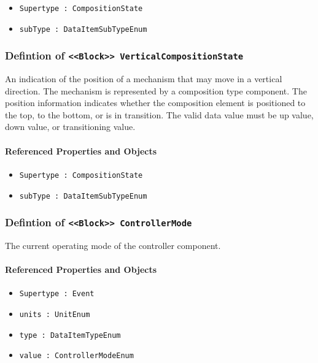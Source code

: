 \begin{itemize}
\item \texttt{Supertype : CompositionState}

\item \texttt{subType : DataItemSubTypeEnum}

\end{itemize}
\FloatBarrier
\subsubsection{Defintion of \texttt{<<Block>> VerticalCompositionState}}
  \label{type:VerticalCompositionState}

\FloatBarrier

An indication of the position of a mechanism that may move in a vertical direction. The mechanism is represented by a composition type component. 
 The position information indicates whether the composition element is positioned to the top, to the bottom, or is in transition.  
 The valid data value must be up value, down value, or transitioning value.

\FloatBarrier
\paragraph{Referenced Properties and Objects}

\begin{itemize}
\item \texttt{Supertype : CompositionState}

\item \texttt{subType : DataItemSubTypeEnum}

\end{itemize}
\FloatBarrier
\subsubsection{Defintion of \texttt{<<Block>> ControllerMode}}
  \label{type:ControllerMode}

\FloatBarrier

The current operating mode of the controller component.

\FloatBarrier
\paragraph{Referenced Properties and Objects}

\begin{itemize}
\item \texttt{Supertype : Event}

\item \texttt{units : UnitEnum}

\item \texttt{type : DataItemTypeEnum}

\item \texttt{value : ControllerModeEnum}

\end{itemize}
\FloatBarrier
